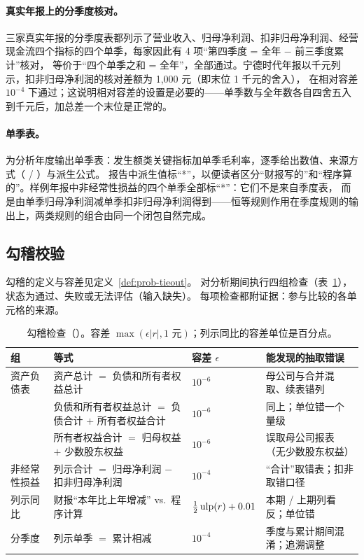 \paragraph{真实年报上的分季度核对。}
三家真实年报的分季度表都列示了营业收入、归母净利润、扣非归母净利润、经营现金流四个指标的四个单季，每家因此有 4 项“第四季度 = 全年 − 前三季度累计”核对，
等价于“四个单季之和 = 全年”，全部通过。宁德时代年报以千元列示，扣非归母净利润的核对差额为 1,000 元（即末位 1 千元的舍入），
在相对容差 $10^{-4}$ 下通过；这说明相对容差的设置是必要的——单季数与全年数各自四舍五入到千元后，加总差一个末位是正常的。

\paragraph{单季表。}
 为分析年度输出单季表：发生额类关键指标加单季毛利率，逐季给出数值、来源方式（ / ）与派生公式。
报告中派生值标“*”，以便读者区分“财报写的”和“程序算的”。样例年报中非经常性损益的四个单季全部标“*”：它们不是来自季度表，
而是由单季归母净利润减单季扣非归母净利润得到——恒等规则作用在季度规则的输出上，两类规则的组合由同一个闭包自然完成。

\subsection{勾稽校验}
\label{sec:an-tieout}

勾稽的定义与容差见定义~\ref{def:prob-tieout}。 对分析期间执行四组检查（表~\ref{tab:an-tieouts}），状态为通过、失败或无法评估（输入缺失）。
每项检查都附证据：参与比较的各单元格的来源。

\begin{table}[t]
\centering
\caption{勾稽检查（）。容差 $\max(\epsilon|r|,1\text{ 元})$；列示同比的容差单位是百分点。}
\label{tab:an-tieouts}
\small
\begin{tabularx}{\linewidth}{l X l X}
\toprule
组 & 等式 & 容差 $\epsilon$ & 能发现的抽取错误 \\
\midrule
资产负债表 & 资产总计 $=$ 负债和所有者权益总计 & $10^{-6}$ & 母公司与合并混取、续表错列 \\
 & 负债和所有者权益总计 $=$ 负债合计 $+$ 所有者权益合计 & $10^{-6}$ & 同上；单位错一个量级 \\
 & 所有者权益合计 $=$ 归母权益 $+$ 少数股东权益 & $10^{-6}$ & 误取母公司报表（无少数股东权益） \\
非经常性损益 & 列示合计 $=$ 归母净利润 $-$ 扣非归母净利润 & $10^{-4}$ & “合计”取错表；扣非取错口径 \\
列示同比 & 财报“本年比上年增减” vs.\ 程序计算 & $\tfrac12\operatorname{ulp}(r)+0.01$ & 本期 / 上期列看反；单位错 \\
分季度 & 列示单季 $=$ 累计相减 & $10^{-4}$ & 季度与累计期间混淆；追溯调整 \\
\bottomrule
\end{tabularx}
\end{table}


